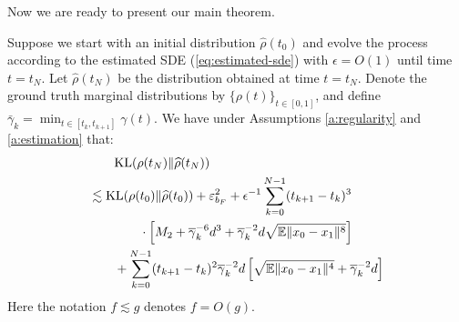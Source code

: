 
Now we are ready to present our main theorem.

\begin{theorem}
    \label{thm:main}
    Suppose we start with an initial distribution $\hat{\rho}(t_0)$ and evolve the process
    according to the estimated SDE (\ref{eq:estimated-sde}) with $\epsilon=O(1)$ until time $t=t_N$. 
    Let $\hat{\rho}(t_N)$ be the distribution obtained at time $t=t_N$. Denote the ground truth marginal distributions by $\{\rho(t)\}_{t\in[0,1]}$, and define $\bar{\gamma}_k=\min_{t\in[t_k,t_{k+1}]}\gamma(t)$. We have  under Assumptions \ref{a:regularity} and \ref{a:estimation} that: 
    $$\begin{aligned}
        &\qquad \textnormal{KL}(\rho(t_N)\Vert\hat{\rho}(t_N))\\
        &\lesssim\textnormal{KL}(\rho(t_0)\Vert\hat{\rho}(t_0))+\varepsilon_{b_F}^2+\epsilon^{-1}\sum_{k=0}^{N-1}(t_{k+1}-t_k)^3\\
&\qquad\qquad\cdot\left[M_2+\bar{\gamma}_k^{-6}d^3+\bar{\gamma}_k^{-2}d\sqrt{\mathbb{E}\Vert x_0-x_1\Vert^{8}}\right]\\
        &\qquad+\sum_{k=0}^{N-1}(t_{k+1}-t_k)^2\bar{\gamma}_k^{-2}d\left[\sqrt{\mathbb{E}\Vert x_0-x_1\Vert^4}+\bar{\gamma}_k^{-2}d\right]
    \end{aligned}$$
Here the notation $f\lesssim g$ denotes  $f=O(g)$.
\end{theorem} 

